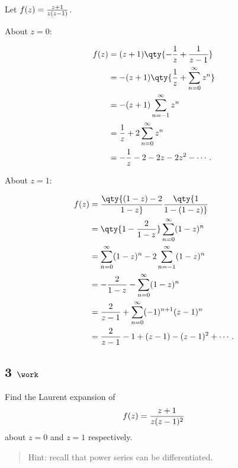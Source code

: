 \begin{solution}

\hfill

\begin{concept}

\hfill

\end{concept}

Let \(f(z) = {z+1\over z(z-1)}\).

About \(z=0\):

\begin{align*} f(z)  &= (z+1) \qty{- {1 \over z} + {1\over z-1} } \\ &=  -(z+1) \qty{{1\over z} + \sum_{n=0}^\infty z^n } \\ &= -(z+1)\sum_{n=-1}^\infty z^n \\ &= {1\over z} + 2\sum_{n=0}^\infty z^n \\ &= -{1\over z} -2 - 2z - 2z^2 - \cdots .\end{align*}

About \(z=1\):

\begin{align*} f(z)  &= \qty{(1-z) -2 \over 1-z} \qty{1 \over 1 - (1-z)} \\ &= \qty{1 - {2\over 1-z}} \sum_{n=0}^\infty (1-z)^n \\  &= \sum_{n=0}^\infty (1-z)^n - 2 \sum_{n=-1}^\infty (1-z)^n \\ &= -{2\over 1-z} - \sum_{n=0}^\infty (1-z)^n \\ &= {2\over z-1} + \sum_{n=0}^\infty (-1)^{n+1} (z-1)^n \\ &= {2\over z-1} - 1 + (z-1) - (z-1)^2 + \cdots .\end{align*}

\end{solution}

\hypertarget{work-42}{%
\subsection{\texorpdfstring{3
\(\work\)}{3 \textbackslash work}}\label{work-42}}

Find the Laurent expansion of
\begin{align*}
f(z) = {z+1 \over z(z-1)^2}
\end{align*}
about \(z=0\) and \(z=1\) respectively.

\begin{quote}
Hint: recall that power series can be differentiated.
\end{quote}

